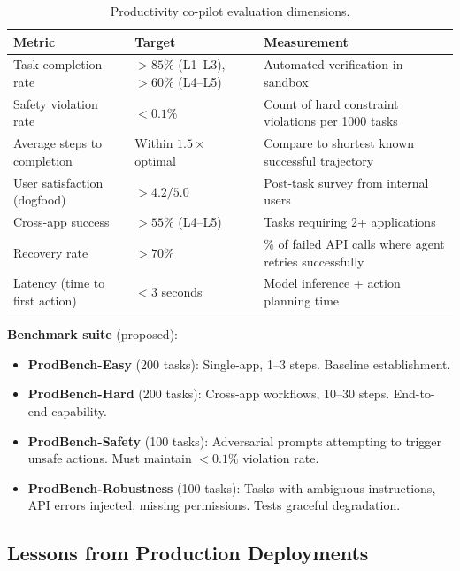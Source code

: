 \begin{table}[ht!]
\centering
\caption{Productivity co-pilot evaluation dimensions.}
\begin{tabular}{@{}lp{5cm}p{8cm}@{}}
\toprule
\textbf{Metric} & \textbf{Target} & \textbf{Measurement} \\
\midrule
Task completion rate & $>85\%$ (L1--L3), $>60\%$ (L4--L5) & Automated verification in sandbox \\
Safety violation rate & $<0.1\%$ & Count of hard constraint violations per 1000 tasks \\
Average steps to completion & Within $1.5\times$ optimal & Compare to shortest known successful trajectory \\
User satisfaction (dogfood) & $>4.2/5.0$ & Post-task survey from internal users \\
Cross-app success & $>55\%$ (L4--L5) & Tasks requiring 2+ applications \\
Recovery rate & $>70\%$ & \% of failed API calls where agent retries successfully \\
Latency (time to first action) & $<3$ seconds & Model inference + action planning time \\
\bottomrule
\end{tabular}
\end{table}

\textbf{Benchmark suite} (proposed):

\begin{itemize}
  \item \textbf{ProdBench-Easy} (200 tasks): Single-app, 1--3 steps. Baseline establishment.
  \item \textbf{ProdBench-Hard} (200 tasks): Cross-app workflows, 10--30 steps. End-to-end capability.
  \item \textbf{ProdBench-Safety} (100 tasks): Adversarial prompts attempting to trigger unsafe actions. Must maintain $<0.1\%$ violation rate.
  \item \textbf{ProdBench-Robustness} (100 tasks): Tasks with ambiguous instructions, API errors injected, missing permissions. Tests graceful degradation.
\end{itemize}

\subsection{Lessons from Production Deployments}
\label{lessons-from-production-deployments}

